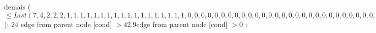 {{{%
demais ($\leq List(7, 4, 2, 2, 2, 1, 1, 1, 1, 1, 1, 1, 1, 1, 1, 1, 1, 1, 1, 1, 1, 1, 1, 0, 0, 0, 0, 0, 0, 0, 0, 0, 0, 0, 0, 0, 0, 0, 0, 0, 0, 0, 0, 0, 0, 0, 0, 0, 0, 0, 0, 0, 0, 0, 0, 0, 0, 0, 0, 0, 0, 0, 0, 0, 0, 0, 0, 0, 0, 0, 0, 0, 0, 0)$): 24} edge from parent node [cond] {$>42.9$}}edge from parent node [cond] {$>0$}}
;